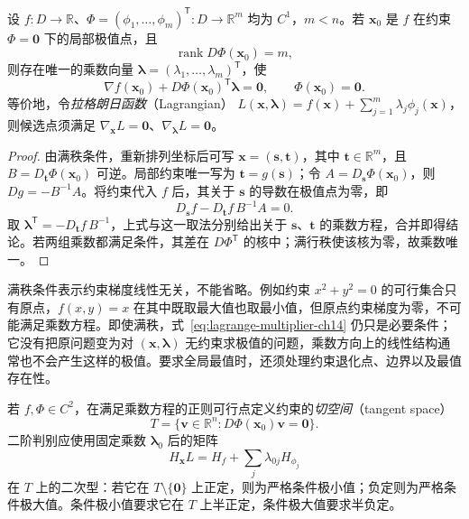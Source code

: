 \begin{theorem}[拉格朗日乘数法的必要条件]
\label{thm:lagrange-multiplier-ch14}
设 $f:D\to\mathbb R$、$\Phi=(\phi_1,\ldots,\phi_m)^{\mathsf T}:D\to\mathbb R^m$ 均为 $C^1$，$m<n$。若 $\boldsymbol x_0$ 是 $f$ 在约束 $\Phi=\boldsymbol0$ 下的局部极值点，且
\[
    \operatorname{rank}D\Phi(\boldsymbol x_0)=m,
\]
则存在唯一的乘数向量 $\boldsymbol\lambda=(\lambda_1,\ldots,\lambda_m)^{\mathsf T}$，使
\begin{equation}
\label{eq:lagrange-multiplier-ch14}
    \nabla f(\boldsymbol x_0)+D\Phi(\boldsymbol x_0)^{\mathsf T}\boldsymbol\lambda
       =\boldsymbol0,\qquad
    \Phi(\boldsymbol x_0)=\boldsymbol0.
\end{equation}
等价地，令\emph{拉格朗日函数}（Lagrangian）
$L(\boldsymbol x,\boldsymbol\lambda)=f(\boldsymbol x)+\sum_{j=1}^m\lambda_j\phi_j(\boldsymbol x)$，则候选点须满足 $\nabla_{\boldsymbol x}L=\boldsymbol0$、$\nabla_{\boldsymbol\lambda}L=\boldsymbol0$。
\end{theorem}
\begin{proof}
由满秩条件，重新排列坐标后可写 $\boldsymbol x=(\boldsymbol s,\boldsymbol t)$，其中 $\boldsymbol t\in\mathbb R^m$，且 $B=D_{\boldsymbol t}\Phi(\boldsymbol x_0)$ 可逆。局部约束唯一写为 $\boldsymbol t=g(\boldsymbol s)$；令 $A=D_{\boldsymbol s}\Phi(\boldsymbol x_0)$，则 $Dg=-B^{-1}A$。将约束代入 $f$ 后，其关于 $\boldsymbol s$ 的导数在极值点为零，即
\[
    D_{\boldsymbol s}f-D_{\boldsymbol t}f\,B^{-1}A=0.
\]
取 $\boldsymbol\lambda^{\mathsf T}=-D_{\boldsymbol t}f\,B^{-1}$，上式与这一取法分别给出关于 $\boldsymbol s$、$\boldsymbol t$ 的乘数方程，合并即得结论。若两组乘数都满足条件，其差在 $D\Phi^{\mathsf T}$ 的核中；满行秩使该核为零，故乘数唯一。
\end{proof}

满秩条件表示约束梯度线性无关，不能省略。例如约束 $x^2+y^2=0$ 的可行集合只有原点，$f(x,y)=x$ 在其中既取最大值也取最小值，但原点约束梯度为零，不可能满足乘数方程。即使满秩，式~\eqref{eq:lagrange-multiplier-ch14} 仍只是必要条件；它没有把原问题变为对 $(\boldsymbol x,\boldsymbol\lambda)$ 无约束求极值的问题，乘数方向上的线性结构通常也不会产生这样的极值。要求全局最值时，还须处理约束退化点、边界以及最值存在性。

若 $f,\Phi\in C^2$，在满足乘数方程的正则可行点定义约束的\emph{切空间}（tangent space）
\[
    T=\{\boldsymbol v\in\mathbb R^n:D\Phi(\boldsymbol x_0)\boldsymbol v=\boldsymbol0\}.
\]
二阶判别应使用固定乘数 $\boldsymbol\lambda_0$ 后的矩阵
\[
    H_{\boldsymbol x}L
       =H_f+\sum_j\lambda_{0j}H_{\phi_j}
\]
在 $T$ 上的二次型：若它在 $T\setminus\{\boldsymbol0\}$ 上正定，则为严格条件极小值；负定则为严格条件极大值。条件极小值要求它在 $T$ 上半正定，条件极大值要求半负定。

